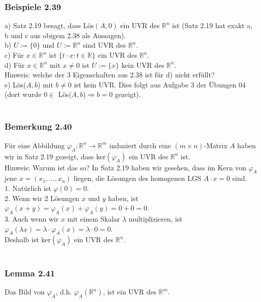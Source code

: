\documentclass{article}
\begin{document}
\subsubsection*{Beispiele 2.39}
a) Satz 2.19 besagt, dass Lös$(A,0)$ ein UVR des $\mathbb{R}^n$ ist (Satz 2.19 hat exakt a, b und c aus obigem 2.38 als Aussagen). \\
b) $U:=\{0\}$ und $U:=\mathbb{R}^n$ sind UVR des $\mathbb{R}^n$. \\
c) Für $x \in \mathbb{R}^n$ ist $\{t\cdot x: t \in \mathbb{R}\}$ ein UVR des $\mathbb{R}^n$. \\
d) Für $x \in \mathbb{R}^n$ mit $x \neq 0$ ist $U:=\{x\}$ kein UVR des $\mathbb{R}^n$. \\
Hinweis: welche der 3 Eigenschaften aus 2.38 ist für d) nicht erfüllt? \\
e) Lös($A,b$) mit $b \neq 0$ ist kein UVR. Dies folgt aus Aufgabe 3 der Übungen 04 (dort wurde $0\in $ Lös($A,b$)$\Rightarrow b=0$ gezeigt). \\
\\
\subsubsection*{Bemerkung 2.40}
Für eine Abbildung $\varphi_A: \mathbb{R}^n \rightarrow \mathbb{R}^m$ induziert durch eine $(m \times n)$-Matrix $A$ haben wir in Satz 2.19 gezeigt, dass ker$(\varphi_A)$ ein UVR des $\mathbb{R}^n$ ist. \\
Hinweis: Warum ist das so? In Satz 2.19 haben wir gesehen, dass im Kern von $\varphi_A$ jene $x=(x_1, ... , x_n)$ liegen, die Lösungen des homogenen LGS $A \cdot x = 0$ sind. \\
1. Natürlich ist $\varphi (0) = 0$. \\
2. Wenn wir 2 Lösungen $x$ und $y$ haben, ist $\varphi_A(x+y) = \varphi_A(x) + \varphi_A(y) = 0 + 0 = 0$.\\
3. Auch wenn wir $x$ mit einem Skalar $\lambda$ multiplizieren, ist $\varphi_A(\lambda x) = \lambda \cdot \varphi_A(x) = \lambda \cdot 0 = 0$. \\
Deshalb ist ker$(\varphi_A)$ ein UVR des $\mathbb{R}^n$. \\
\\
\subsubsection*{Lemma 2.41}
Das Bild von $\varphi_A$, d.h. $\varphi_A(\mathbb{R}^n)$, ist ein UVR des $\mathbb{R}^m$. \\
\\
\end{document}
